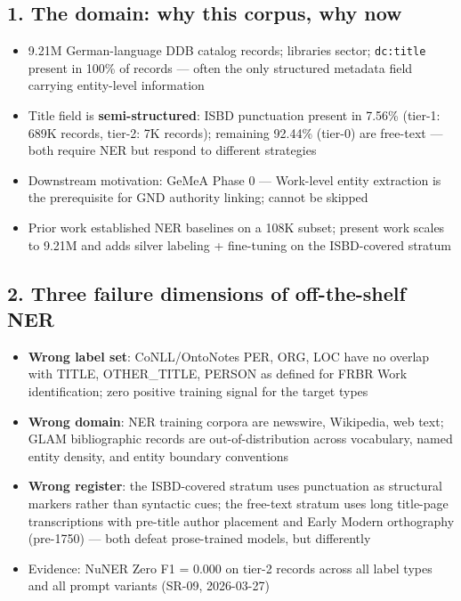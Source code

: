 \subsection*{1. The domain: why this corpus, why now}
\begin{itemize}
    \item 9.21M German-language DDB catalog records; libraries sector;
          \texttt{dc:title} present in 100\% of records --- often the only
          structured metadata field carrying entity-level information
    \item Title field is \textbf{semi-structured}: ISBD punctuation present in
          7.56\% (tier-1: 689K records, tier-2: 7K records); remaining 92.44\%
          (tier-0) are free-text --- both require NER but respond to different strategies
    \item Downstream motivation: GeMeA Phase 0 --- Work-level entity extraction
          is the prerequisite for GND authority linking; cannot be skipped
    \item Prior work \cite{tan-etal-2024-card} established NER baselines on a
          108K subset; present work scales to 9.21M and adds silver labeling +
          fine-tuning on the ISBD-covered stratum
\end{itemize}

\subsection*{2. Three failure dimensions of off-the-shelf NER}
\begin{itemize}
    \item \textbf{Wrong label set}: CoNLL/OntoNotes PER, ORG, LOC have no overlap
          with TITLE, OTHER\_TITLE, PERSON as defined for FRBR Work identification;
          zero positive training signal for the target types
    \item \textbf{Wrong domain}: NER training corpora are newswire, Wikipedia, web text;
          GLAM bibliographic records are out-of-distribution across vocabulary,
          named entity density, and entity boundary conventions
    \item \textbf{Wrong register}: the ISBD-covered stratum uses punctuation as
          structural markers rather than syntactic cues; the free-text stratum
          uses long title-page transcriptions with pre-title author placement and
          Early Modern orthography (pre-1750) --- both defeat prose-trained models,
          but differently
    \item Evidence: NuNER Zero F1 = 0.000 on tier-2 records across all label types
          and all prompt variants (SR-09, 2026-03-27)
\end{itemize}

